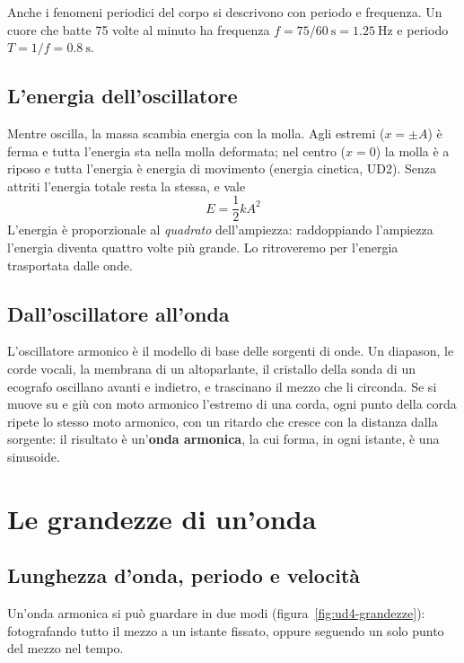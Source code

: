 Anche i fenomeni periodici del corpo si descrivono con periodo e frequenza. Un cuore che batte 75 volte al minuto ha frequenza $f = 75/\SI{60}{\second} = \SI{1,25}{\hertz}$ e periodo $T = 1/f = \SI{0,8}{\second}$.



\subsection{L'energia dell'oscillatore}

Mentre oscilla, la massa scambia energia con la molla. Agli estremi ($x = \pm A$) è ferma e tutta l'energia sta nella molla deformata; nel centro ($x = 0$) la molla è a riposo e tutta l'energia è energia di movimento (energia cinetica, UD2). Senza attriti l'energia totale resta la stessa, e vale
\[
  E = \frac{1}{2} k A^2
\]
L'energia è proporzionale al \emph{quadrato} dell'ampiezza: raddoppiando l'ampiezza l'energia diventa quattro volte più grande. Lo ritroveremo per l'energia trasportata dalle onde.

\subsection{Dall'oscillatore all'onda}

L'oscillatore armonico è il modello di base delle sorgenti di onde. Un diapason, le corde vocali, la membrana di un altoparlante, il cristallo della sonda di un ecografo oscillano avanti e indietro, e trascinano il mezzo che li circonda. Se si muove su e giù con moto armonico l'estremo di una corda, ogni punto della corda ripete lo stesso moto armonico, con un ritardo che cresce con la distanza dalla sorgente: il risultato è un'\textbf{onda armonica}, la cui forma, in ogni istante, è una sinusoide.

\section{Le grandezze di un'onda}
\label{sec:ud4-grandezze}

\subsection{Lunghezza d'onda, periodo e velocità}

Un'onda armonica si può guardare in due modi (figura~\ref{fig:ud4-grandezze}): fotografando tutto il mezzo a un istante fissato, oppure seguendo un solo punto del mezzo nel tempo.

